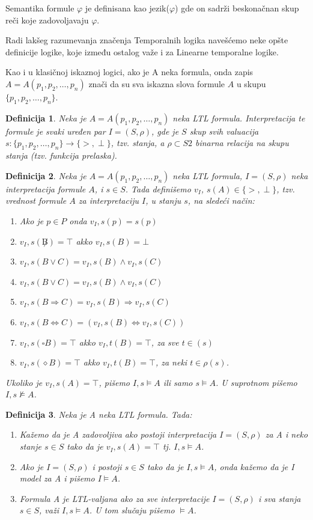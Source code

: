 \documentclass[a4paper]{article}
\newtheorem{definicija}{Definicija}[section]
\begin{document}
{	Semantika formule $\varphi$ je definisana kao jezik($\varphi$) gde on sadrži beskonačnan skup reči koje zadovoljavaju $\varphi$.\newline
	
	Radi lakšeg razumevanja značenja Temporalnih logika navešćemo neke opšte definicije logike, koje između ostalog važe i za Linearne temporalne logike.

	Kao i u klasičnoj iskaznoj logici, ako je A neka formula, onda zapis $A = A(p_1, p_2, \dots , p_n)$ znači da su sva iskazna slova formule $A$ u skupu $\{p_1, p_2, \dots , p_n\}$.
\begin{definicija}
Neka je $A = A(p_1, p_2, \dots , p_n)$ neka LTL formula. Interpretacija te formule je svaki uređen par $I = (S, \rho)$, gde je $S$ skup svih valuacija $s : \{p_1, p_2, \dots , p_n\} \to \{>, \perp \}$, tzv. stanja, a $\rho \subset S2$ binarna relacija na skupu stanja (tzv. funkcija prelaska).
\end{definicija}
\begin{definicija}    
Neka je $A = A(p_1, p_2, \dots , p_n)$ neka LTL formula, $I = (S, \rho)$ neka interpretacija formule $A$, i $s \in S$. Tada definišemo $v_I$, $s(A) \in \{>, \perp \}$, tzv. vrednost formule $A$ za interpretaciju $I$, u stanju $s$, na sledeći način:
\begin{enumerate}	
\item  Ako je $p \in P$ onda $v_I,s(p) = s(p)$
\item $v_I,s(\not B) = \top$ akko $v_I,s(B) = \bot$
\item  $v_I,s(B \vee C) = v_I,s(B) \wedge v_I,s(C)$
\item  $v_I,s(B \vee C) = v_I,s(B) \wedge v_I,s(C)$
\item $v_I,s(B \Rightarrow C) = v_I,s(B) \Rightarrow v_I,s(C)$
\item $v_I,s(B \Leftrightarrow C) = (v_I,s(B) \Leftrightarrow v_I,s(C))$
\item  $v_I,s(\square B) = \top$ akko $v_I,t(B) = \top$, za sve $t \in (s)$
\item $v_I,s(\diamond B) = \top$ akko $v_I,t(B) = \top$, za neki $t \in \rho(s)$.
\end{enumerate}	
Ukoliko je $v_I,s(A) = \top$, pišemo $I, s \models A$ ili samo $s \models A$. U suprotnom pišemo $I, s \nvDash A$.
\end{definicija} 
\begin{definicija}
Neka je A neka LTL formula. Tada:
\begin{enumerate}	
\item Kažemo da je A zadovoljiva ako postoji interpretacija $I = (S, \rho)$ za A i neko stanje $s \in S$ tako da je $v_I,s(A) = \top$ tj. $I, s \models A$.
\item Ako je $I = (S, \rho)$ i postoji $s \in S$ tako da je $I, s \models A$, onda kažemo da je I model za A i pišemo $I \models A$.
\item Formula A je LTL-valjana ako za sve interpretacije $I = (S, \rho)$ i sva stanja $s \in S$, važi $I, s \models A$. U tom slučaju pišemo $\models A$.\end{enumerate}	
\end{definicija}

}
\end{document}
